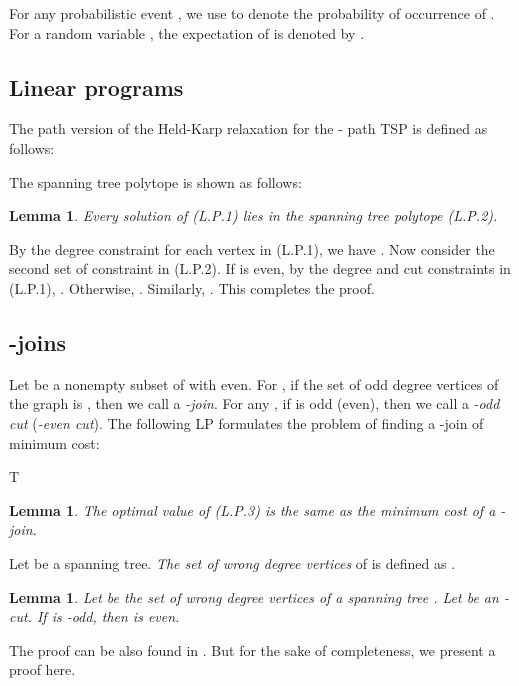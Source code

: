 \documentclass[11pt]{article}
\newcommand{\qed}{\hspace*{\fill}}
\newtheorem{lemma}[theorem]{Lemma}
\newenvironment{proof}[1][Proof. ]{\noindent {\bf #1 }}{\qed}
\begin{document}
For any probabilistic event ,
we use  to denote the probability of occurrence of .
For a random variable ,
the expectation of  is denoted by .



\subsection{Linear programs}

The path version of the Held-Karp relaxation for
the - path TSP is defined as follows:



The spanning tree polytope is shown as follows:



\begin{lemma}
Every solution  of (L.P.1) lies in the spanning tree polytope (L.P.2).
\end{lemma}
\begin{proof}
By the degree constraint for each vertex in (L.P.1), we have . Now consider the second set of constraint in (L.P.2). If  is even, by the degree and cut constraints in (L.P.1), . Otherwise, . Similarly, . This completes the proof.
\end{proof}



\subsection{-joins}

Let  be a nonempty subset of  with  even.
For , if the set of odd degree vertices of
the graph  is , then we call  a \emph{-join}.
For any , if  is odd (even),
then we call  a \emph{-odd cut} (\emph{-even cut}).
The following LP formulates the problem of
finding a -join of minimum cost:
\medskip

T
\begin{lemma}\cite{EJ01}\label{lem:Tjoin}
The optimal value of (L.P.3) is the same as the minimum cost of a -join.
\end{lemma}

Let  be a spanning tree. \emph{The set of wrong degree vertices} of  is defined as .
\begin{lemma}\cite{AKS12}\label{lem:simpleParity}
Let  be the set of wrong degree vertices of a spanning tree . Let  be an - cut. If  is -odd, then  is even.
\end{lemma}

The proof can be also found in \cite[Lemma 2.1]{CFG12}. But for the sake of completeness, we present a proof here.
\end{document}
